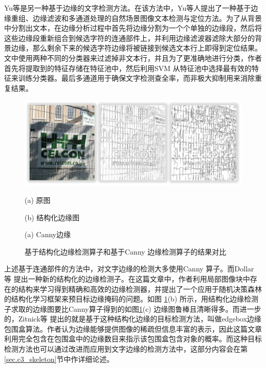     Yu等\cite{Yu2016Scene}是另一种基于边缘的文字检测方法。在该方法中，Yu等人提出了一种基于边缘重组、边缘滤波和多通道处理的自然场景图像文本检测与定位方法。为了从背景中分割出文本，在边缘分析过程中首先将边缘分割为一个个单独的边缘段，然后将这些边缘段重新组合到候选字符的连通部件上，并利用边缘滤波器滤除大部分的背景边缘，那么剩余下来的候选字符边缘将被链接到候选文本行上即得到定位结果。文中使用两种不同的分类器来过滤掉非文本行，并且为了更准确地进行分类，作者首先将提取到的特征存储在特征池中，然后利用SVM 从特征池中选择最有效的特征来训练分类器。最后多通道用于确保文字检测查全率，而非极大抑制用来消除重复结果。

    \begin{figure}[!h]
    \centering
    \includegraphics[width=\textwidth]{./figures/c2_sf_vs_canny.jpg}
    \begin{minipage}[t]{0.32\linewidth}
    \centerline{ \small (a) 原图}
    \end{minipage}
    \begin{minipage}[t]{0.32\linewidth}
    \centerline{ \small (b) 结构化边缘图}
    \end{minipage}
    \begin{minipage}[t]{0.32\linewidth}
    \centerline{ \small (a) Canny边缘}
    \end{minipage}
    \caption{基于结构化边缘检测算子和基于Canny 边缘检测算子的结果对比}
    \label{fig.c2_sf_vs_canny}
    \end{figure}

    上述基于连通部件的方法中，对文字边缘的检测大多使用Canny 算子。而Dollar 等\cite{Dollar2015Fast} 提出一种新的结构化的边缘检测子。在这篇文章中，作者利用局部图像块中存在的结构来学习得到精确和高效的边缘检测器，并提出了一个应用于随机决策森林的结构化学习框架来预目标边缘掩码的问题。如图       \ref{fig.c2_sf_vs_canny}(b) 所示，用结构化边缘检测子求取的边缘图要比Canny算子得到的如图\ref{fig.c2_sf_vs_canny}(c) 边缘图鲁棒且清晰得多。而进一步的，Zitnick等\cite{Zitnick2014Edge} 提出的就是基于这种结构化边缘的目标检测方法，叫做edgebox边缘包围盒算法。作者认为边缘能够提供图像的稀疏但信息丰富的表示，因此这篇文章利用完全包含在包围盒中的边缘数目来指示该包围盒包含对象的概率。而这种目标检测方法也可以通过改进而应用到文字边缘的检测方法中，这部分内容会在第\ref{sec.c3_skeleton}节中作详细论述。

